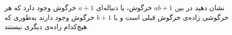 \EXERCISE
نشان دهید در بین
$ab + 1$
خرگوش، یا دنباله‌ای
$a + 1$
خرگوش وجود دارد که هر خرگوشی زاده‌ی خرگوش قبلی است و یا
$b + 1$
خرگوش وجود دارند به‌طوری که هیچ‌کدام زاده‌ی دیگری نیستند.